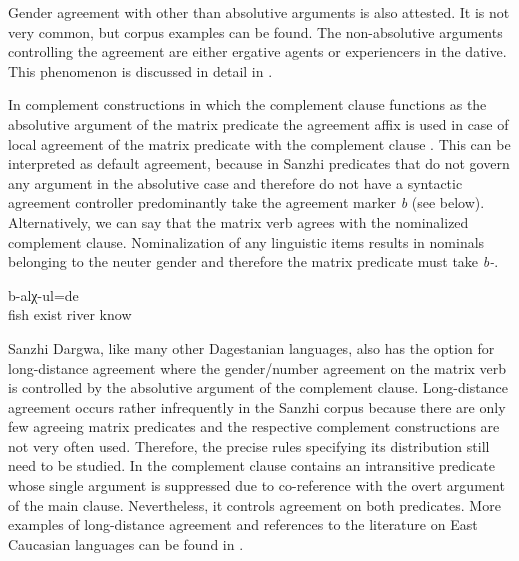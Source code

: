Gender agreement with other than absolutive arguments is also attested. It is not very common, but corpus examples can be found. The non-absolutive arguments controlling the agreement are either ergative agents or experiencers in the dative. This phenomenon is discussed in detail in . 

In complement constructions in which the complement clause functions as the absolutive argument of the matrix predicate the agreement affix  is used in case of local agreement of the matrix predicate with the complement clause . This can be interpreted as default agreement, because in Sanzhi predicates that do not govern any argument in the absolutive case and therefore do not have a syntactic agreement controller predominantly take the agreement marker \textit{b} (see below). Alternatively, we can say that the matrix verb agrees with the nominalized complement clause. Nominalization of any linguistic items results in nominals belonging to the neuter gender and therefore the matrix predicate must take \textit{b-}. 
%
\begin{exe}
		\ex	\label{ex:(S/he/they) knew that there were our fish in our river@14a}
			b-alχ-ul=de\\
				fish	exist		river	know\\
		\glt	{}
\end{exe}

Sanzhi Dargwa, like many other Dagestanian languages, also has the option for long-distance agreement where the gender/number agreement on the matrix verb is controlled by the absolutive argument of the complement clause. Long-distance agreement occurs rather infrequently in the Sanzhi corpus because there are only few agreeing matrix predicates and the respective complement constructions are not very often used. Therefore, the precise rules specifying its distribution still need to be studied. In  the complement clause contains an intransitive predicate whose single argument is suppressed due to co-reference with the overt argument of the main clause. Nevertheless, it controls agreement on both predicates. More examples of long-distance agreement and references to the literature on East Caucasian languages can be found in .

